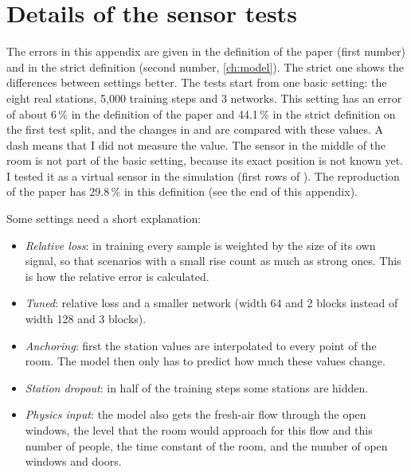 \chapter{Details of the sensor tests}
\label{app:sensortests}

The errors in this appendix are given in the definition of the paper (first number) and in the strict
definition (second number, \cref{ch:model}). The strict one shows the differences between settings better. The tests
start from one basic setting: the eight real stations, 5,000 training steps and 3 networks. This setting has an
error of about 6\,\% in the definition of the paper and 44.1\,\% in the strict definition on the first test split,
and the changes in  and  are compared with these values. A dash means that I did not
measure the value. The sensor in the middle of the room is not part of the basic setting,
because its exact position is not known yet. I tested it as a virtual sensor in the simulation (first rows of
). The reproduction of the paper has 29.8\,\% in this definition (see the end of this appendix).

Some settings need a short explanation:
\begin{itemize}
  \item \emph{Relative loss}: in training every sample is weighted by the size of its own signal, so that
        scenarios with a small \cotwo{} rise count as much as strong ones. This is how the relative error is
        calculated.
  \item \emph{Tuned}: relative loss and a smaller network (width 64 and 2 blocks instead of width 128 and 3 blocks).
  \item \emph{Anchoring}: first the station values are interpolated to every point of the room. The model then only
        has to predict how much these values change.
  \item \emph{Station dropout}: in half of the training steps some stations are hidden.
  \item \emph{Physics input}: the model also gets the fresh-air flow through the open windows, the \cotwo{} level
        that the room would approach for this flow and this number of people, the time constant of the room, and
        the number of open windows and doors.
\end{itemize}

